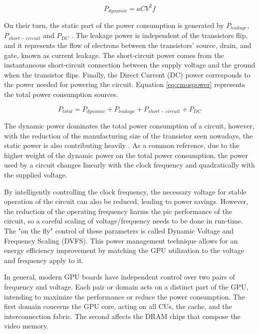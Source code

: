 \begin{equation}
    P_{dynamic} = aCV^2f
    \label{eq:dynpower}
\end{equation}


On their turn, the static part of the power consumption is generated by $P_{leakage}$, $P_{short-circuit}$ and $P_{DC}$ \cite{mei_survey_2016}. The leakage power is independent of the transistors flip, and it represents the flow of electrons between the transistors' source, drain, and gate, known as current leakage. The short-circuit power comes from the instantaneous short-circuit connection between the supply voltage and the ground when the transistor flips. Finally, the Direct Current (DC) power corresponds to the power needed for powering the circuit. Equation \ref{eq:cmospower} represents the total power consumption sources.

\begin{equation}
    P_{total} = P_{dynamic} + P_{leakage} + P_{short-circuit} + P_{DC}
    \label{eq:cmospower}
\end{equation}

The dynamic power dominates the total power consumption of a circuit, however, with the reduction of the manufacturing size of the transistor seen nowadays, the static power is also contributing heavily \cite{s._hong_modeling_2012} \cite{hong_integrated_2010}. As a common reference, due to the higher weight of the dynamic power on the total power consumption, the power used by a circuit changes linearly with the clock frequency and quadratically with the supplied voltage.

By intelligently controlling the clock frequency, the necessary voltage for stable operation of the circuit can also be reduced, leading to power savings. However, the reduction of the operating frequency harms the pic performance of the circuit, so a careful scaling of voltage/frequency needs to be done in run-time. The "on the fly" control of these parameters is called Dynamic Voltage and Frequency Scaling (DVFS). This power management technique allows for an energy efficiency improvement by matching the GPU utilization to the voltage and frequency apply to it.

In general, modern GPU boards have independent control over two pairs of frequency and voltage. Each pair or domain acts on a distinct part of the GPU, intending to maximize the performance or reduce the power consumption. The first domain concerns the GPU core, acting on all CUs, the cache, and the interconnection fabric. The second affects the DRAM chips that compose the video memory. 

